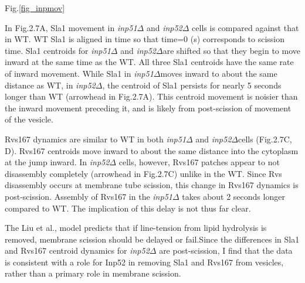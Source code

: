  Fig.\ref{fig_inpmov}

 In Fig.2.7A, Sla1 movement in \textit{inp51$\Delta$} and \textit{inp52$\Delta$}
 cells is compared against that in WT. WT Sla1 is aligned in time so that time=0 (s) corresponds to scission time. Sla1 centroids for \textit{inp51$\Delta$} and \textit{inp52$\Delta$}are shifted so that they begin to move inward at the same time as the WT. All three Sla1 centroids have the same rate of inward movement. While Sla1 in \textit{inp51$\Delta$}moves inward to about the same distance as WT, in \textit{inp52$\Delta$}, the centroid of Sla1 persists for nearly 5 seconds longer than WT (arrowhead in Fig.2.7A). This centroid movement is noisier than the inward movement preceding it, and is likely from post-scission of movement of the vesicle. 


\vspace{5mm}	
Rvs167 dynamics are similar to WT in both \textit{inp51$\Delta$}
 and \textit{inp52$\Delta$}cells (Fig.2.7C, D). Rvs167 centroids move inward to about the same distance into the cytoplasm at the jump inward. In \textit{inp52$\Delta$} cells, however, Rvs167 patches appear to not disassembly completely (arrowhead in Fig.2.7C) unlike in the WT. Since Rvs disassembly occurs at membrane tube scission, this change in Rvs167 dynamics is post-scission. Assembly of Rvs167 in the \textit{inp51$\Delta$}
 takes about 2 seconds longer compared to WT. The implication of this delay is not thus far clear. 

	\vspace{5mm}
The Liu et al., model predicts that if line-tension from lipid hydrolysis is removed, membrane scission should be delayed or fail.Since the differences in Sla1 and Rvs167 centroid dynamics for \textit{inp52$\Delta$} are post-scission, I find that the data is consistent with a role for Inp52 in removing Sla1 and Rvs167 from vesicles, rather than a primary role in membrane scission. 


